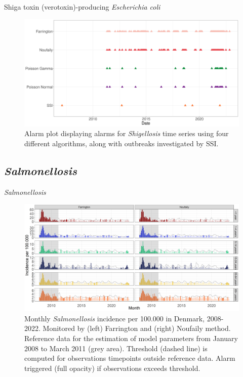 \documentclass[aspectratio=169]{beamer}
\begin{document}
\begin{frame}{Shiga toxin (verotoxin)-producing \emph{Escherichia coli}}
\protect\hypertarget{shiga-toxin-verotoxin-producing-escherichia-coli-2}{}
\tiny

\begin{figure}[H]
\includegraphics[width=0.7\linewidth]{../figures/Compare_alarms_STEC} \caption{Alarm plot displaying alarms for \textit{Shigellosis} time series using four different algorithms, along with outbreaks investigated by SSI.}\label{fig:CompareAlarmsSTEC}
\end{figure}

\normalsize
\end{frame}

\hypertarget{salmonellosis}{%
\subsection{\texorpdfstring{\emph{Salmonellosis}}{Salmonellosis}}\label{salmonellosis}}

\begin{frame}{\emph{Salmonellosis}}
\tiny

\begin{figure}[H]
\includegraphics[width=0.7\linewidth]{../figures/Compare_stateOfTheArt_SALM} \caption{Monthly \textit{Salmonellosis} incidence per 100.000 in Denmark, 2008-2022. Monitored by (left) Farrington and (right) Noufaily method. Reference data for the estimation of model parameters from January 2008 to March 2011 (grey area). Threshold (dashed line) is computed for observations timepoints outside reference data. Alarm triggered (full opacity) if observations exceeds threshold. }\label{fig:CompareStateOfTheArtSALM}
\end{figure}

\normalsize
\end{frame}
\end{document}
